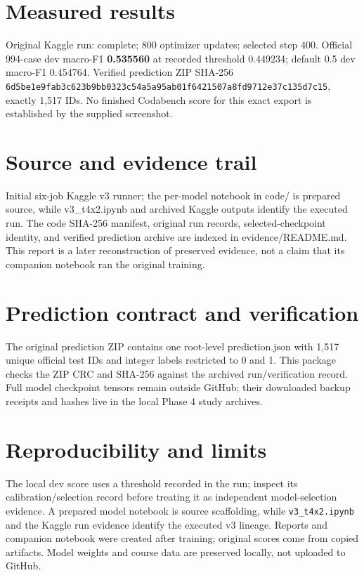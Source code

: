 \documentclass[11pt,a4paper]{article}
\begin{document}
\section{Measured results}
Original Kaggle run: complete; 800 optimizer updates; selected step 400. Official 994-case dev macro-F1 \textbf{0.535560} at recorded threshold 0.449234; default 0.5 dev macro-F1 0.454764. Verified prediction ZIP SHA-256 \texttt{6d5be1e9fab3c623b9bb0323c54a5a95ab01f6421507a8fd9712e37c135d7c15}, exactly 1,517 IDs. No finished Codabench score for this exact export is established by the supplied screenshot.
\section{Source and evidence trail}
Initial six-job Kaggle v3 runner; the per-model notebook in code/ is prepared source, while v3\_t4x2.ipynb and archived Kaggle outputs identify the executed run. The code SHA-256 manifest, original run records, selected-checkpoint identity, and verified prediction archive are indexed in evidence/README.md. This report is a later reconstruction of preserved evidence, not a claim that its companion notebook ran the original training.
\section{Prediction contract and verification}
The original prediction ZIP contains one root-level prediction.json with 1,517 unique official test IDs and integer labels restricted to 0 and 1. This package checks the ZIP CRC and SHA-256 against the archived run/verification record. Full model checkpoint tensors remain outside GitHub; their downloaded backup receipts and hashes live in the local Phase 4 study archives.
\section{Reproducibility and limits}
The local dev score uses a threshold recorded in the run; inspect its calibration/selection record before treating it as independent model-selection evidence. A prepared model notebook is source scaffolding, while \texttt{v3\_t4x2.ipynb} and the Kaggle run evidence identify the executed v3 lineage. Reports and companion notebook were created after training; original scores come from copied artifacts. Model weights and course data are preserved locally, not uploaded to GitHub.
\end{document}
